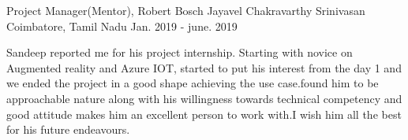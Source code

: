 

\begin{cventries}

  \cventry
    {Project Manager(Mentor), Robert Bosch} %
    {Jayavel Chakravarthy Srinivasan} %
    {Coimbatore, Tamil Nadu} %
    {Jan. 2019 - june. 2019} %
    {
      \begin{cvitems} %
        \item {Sandeep reported me for his project internship. Starting with novice on Augmented reality and Azure IOT, \newline started to put his interest from the day 1 and we ended the project in a good shape achieving the use case.found \newline him to be approachable nature along with his willingness towards technical competency and good attitude makes him an excellent person to work with.I wish him all the best for his future endeavours.}
      \end{cvitems}
    }




\end{cventries}

